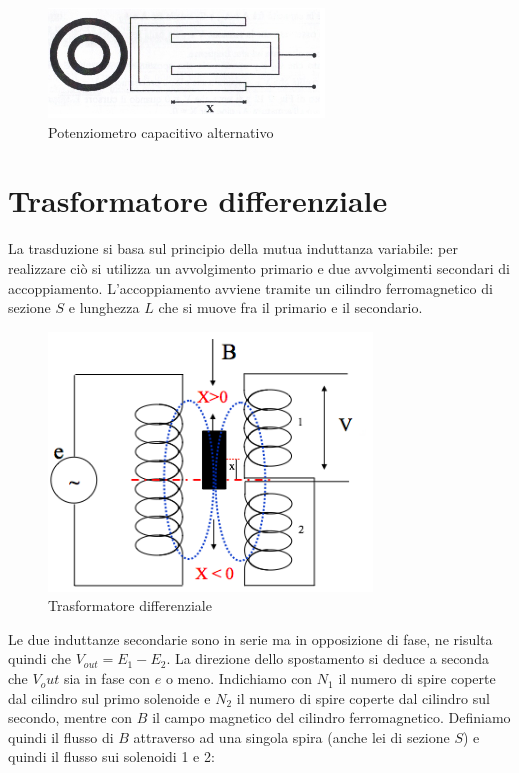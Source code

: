 \begin{figure}[htbp]
	\centering
	\includegraphics[scale=0.5]
{img/potenziometro-capacitivo-2.png}
	\caption{Potenziometro
capacitivo alternativo\label{fig:potcapacitivoalt}}
\end{figure}

\section{Trasformatore differenziale}
La trasduzione si basa sul principio della mutua induttanza variabile:
per realizzare ciò si utilizza un avvolgimento primario e due
avvolgimenti secondari di accoppiamento. L'accoppiamento avviene
tramite un cilindro ferromagnetico di sezione $S$ e lunghezza $L$ che
si muove fra il primario e il secondario.

\begin{figure}[htbp]
	\centering
	\includegraphics[scale=0.5]
{img/trasformatore-differenziale.png}
	\caption{Trasformatore differenziale\label{fig:trasdiff}}
\end{figure}

Le due induttanze secondarie sono in serie ma in opposizione di fase,
ne risulta quindi che $V_{out}=E_1-E_2$. La direzione dello
spostamento si deduce a seconda che $V_out$ sia in fase con $e$ o
meno. Indichiamo con $N_1$ il numero di spire coperte dal cilindro sul
primo solenoide e $N_2$ il numero di spire coperte dal cilindro sul
secondo, mentre con $B$ il campo magnetico del cilindro
ferromagnetico. Definiamo quindi il flusso di $B$ attraverso ad una
singola spira (anche lei di sezione $S$) e quindi il flusso sui
solenoidi 1 e 2:

